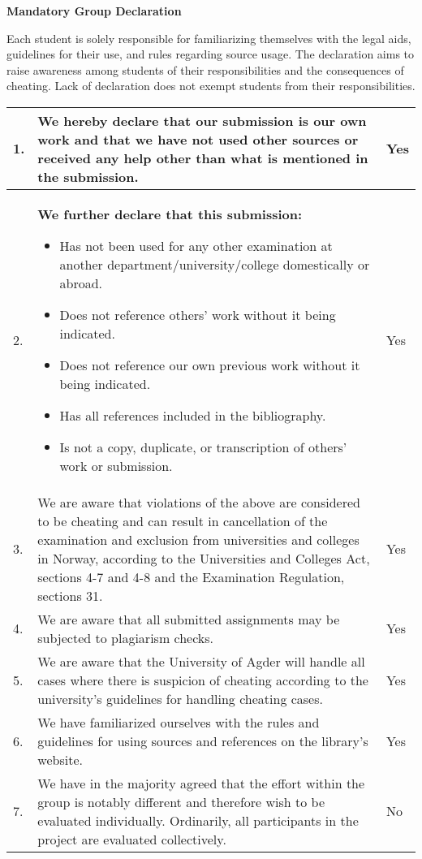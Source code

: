 

\large{\bf{Mandatory Group Declaration}}

{\small {}
Each student is solely responsible for familiarizing themselves with the legal aids, guidelines for their use, and rules regarding source usage. The declaration aims to raise awareness among students of their responsibilities and the consequences of cheating. Lack of declaration does not exempt students from their responsibilities.

\begin{center}
\begin{tabular}{ |p{0.2cm}|p{13.5cm}|p{1cm}|}
\hline

1.& We hereby declare that our submission is our own work and that we have not used other sources or received any help other than what is mentioned in the submission. & Yes  \\
\hline
2. & \textbf{We further declare that this submission:}
\begin{itemize}
\item Has not been used for any other examination at another department/university/college domestically or abroad.
\item Does not reference others' work without it being indicated.
\item Does not reference our own previous work without it being indicated.
\item Has all references included in the bibliography.
\item Is not a copy, duplicate, or transcription of others' work or submission.
\end{itemize}& Yes \\
\hline
3. & We are aware that violations of the above are considered to be cheating and can result in cancellation of the examination and exclusion from universities and colleges in Norway, according to the Universities and Colleges Act, sections 4-7 and 4-8 and the Examination Regulation, sections 31.
 & Yes \\
\hline
4. & We are aware that all submitted assignments may be subjected to plagiarism checks.
& Yes \\
\hline
5. & We are aware that the University of Agder will handle all cases where there is suspicion of cheating according to the university's guidelines for handling cheating cases.
& Yes \\
\hline
6. & We have familiarized ourselves with the rules and guidelines for using sources and references on the library's website.
& Yes \\
\hline
7. & We have in the majority agreed that the effort within the group is notably different and therefore wish to be evaluated individually.
Ordinarily, all participants in the project are evaluated collectively.
& No \\
\hline
\end{tabular}
\end{center}
}

